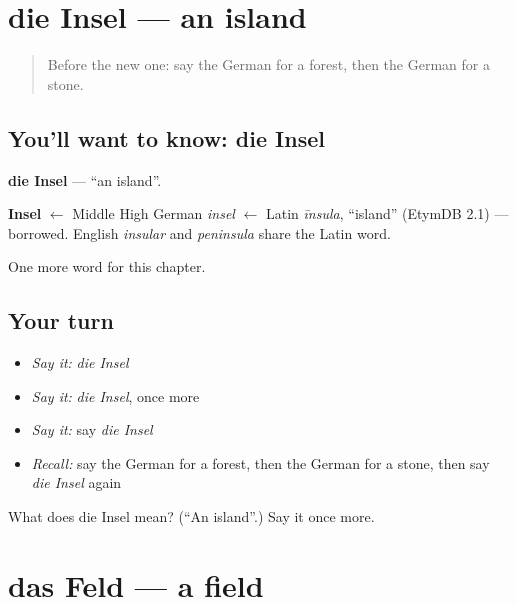 \section[die Insel]{die Insel — an island}

\label{lesson:GE-C83-insel}



\begin{quote}
Before the new one: say the German for a forest, then the German for a stone.
\end{quote}

\subsection*{You'll want to know: die Insel}
\textbf{die Insel} — \textquotedblleft{}an island\textquotedblright{}.

\begin{cousinweb}
\textbf{Insel} $\leftarrow$ Middle High German \emph{insel} $\leftarrow$ Latin \emph{īnsula}, \textquotedblleft{}island\textquotedblright{} (EtymDB 2.1) — borrowed. English \emph{insular} and \emph{peninsula} share the Latin word.
\end{cousinweb}

\begin{grammarlens}[title={What you've built}]
One more word for this chapter.
\end{grammarlens}

\subsection*{Your turn}
\begin{itemize}
\raggedright
  \item \emph{Say it:} \emph{die Insel}
  \item \emph{Say it:} \emph{die Insel}, once more
  \item \emph{Say it:} say \emph{die Insel}
  \item \emph{Recall:} say the German for a forest, then the German for a stone, then say \emph{die Insel} again
\end{itemize}

\begin{tcolorbox}[breakable,colback=teal!4,colframe=teal!35!black,title={Before you move on}]
What does die Insel mean? (\textquotedblleft{}An island\textquotedblright{}.) Say it once more.
\end{tcolorbox}
\section[das Feld]{das Feld — a field}

